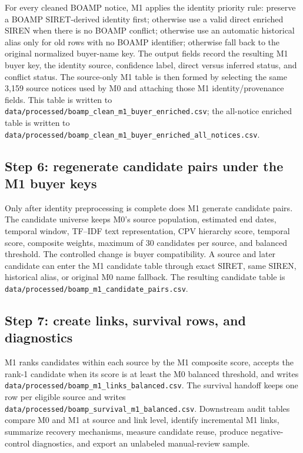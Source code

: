 \documentclass[11pt]{article}
\begin{document}
For every cleaned BOAMP notice, M1 applies the identity priority rule:
preserve a BOAMP SIRET-derived identity first; otherwise use a valid direct
enriched SIREN when there is no BOAMP conflict; otherwise use an automatic
historical alias only for old rows with no BOAMP identifier; otherwise fall
back to the original normalized buyer-name key. The output fields record the
resulting M1 buyer key, the identity source, confidence label, direct versus
inferred status, and conflict status. The source-only M1 table is then formed
by selecting the same 3,159 source notices used by M0 and attaching those M1
identity/provenance fields. This table is written to
\texttt{data/processed/boamp\_clean\_m1\_buyer\_enriched.csv}; the all-notice
enriched table is written to
\texttt{data/processed/boamp\_clean\_m1\_buyer\_enriched\_all\_notices.csv}.

\subsection{Step 6: regenerate candidate pairs under the M1 buyer keys}

Only after identity preprocessing is complete does M1 generate candidate
pairs. The candidate universe keeps M0's source population, estimated end
dates, temporal window, TF--IDF text representation, CPV hierarchy score,
temporal score, composite weights, maximum of 30 candidates per source, and
balanced threshold. The controlled change is buyer compatibility. A source
and later candidate can enter the M1 candidate table through exact SIRET,
same SIREN, historical alias, or original M0 name fallback. The resulting
candidate table is
\texttt{data/processed/boamp\_m1\_candidate\_pairs.csv}.

\subsection{Step 7: create links, survival rows, and diagnostics}

M1 ranks candidates within each source by the M1 composite score, accepts
the rank-1 candidate when its score is at least the M0 balanced threshold,
and writes \texttt{data/processed/boamp\_m1\_links\_balanced.csv}. The
survival handoff keeps one row per eligible source and writes
\texttt{data/processed/boamp\_survival\_m1\_balanced.csv}. Downstream audit
tables compare M0 and M1 at source and link level, identify incremental M1
links, summarize recovery mechanisms, measure candidate reuse, produce
negative-control diagnostics, and export an unlabeled manual-review sample.
\end{document}
